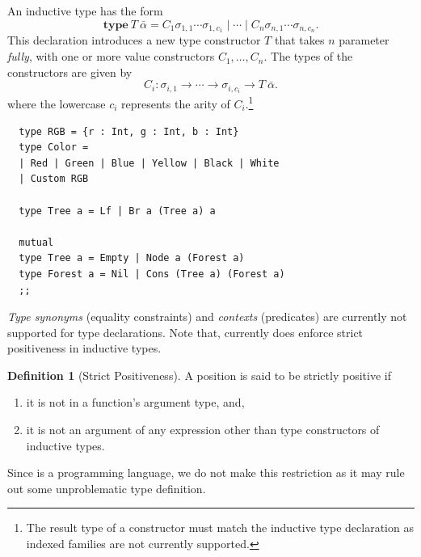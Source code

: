 \documentclass[a4paper, 11pt]{article}
\theoremstyle{remark}\newtheorem*{remark}{Remark}
\theoremstyle{definition}\newtheorem*{definition}{Definition}
\begin{document}
An inductive type has the form
\[
  \mathbf{type}\ T\ \bar{\alpha} =
  C_1 \sigma_{1,1}\cdots\sigma_{1,c_1}
  \mid\cdots
  \mid C_n \sigma_{n,1}\cdots\sigma_{n,c_n}.
\]
This declaration introduces a new type constructor \(T\)
that takes \(n\) parameter \emph{fully}, with one or more value constructors \(C_1,\dots,C_n\).
The types of the constructors are given by
\[
  C_i : \sigma_{i,1}\to\cdots\to\sigma_{i,c_i}\to T\ \bar{\alpha}.
\]
where the lowercase \(c_i\) represents the arity of \(C_i\).\footnote{
  The result type of a constructor must match the inductive type declaration as indexed families
  are not currently supported.
}
\begin{verbatim}
  type RGB = {r : Int, g : Int, b : Int}
  type Color =
  | Red | Green | Blue | Yellow | Black | White
  | Custom RGB

  type Tree a = Lf | Br a (Tree a) a

  mutual
  type Tree a = Empty | Node a (Forest a)
  type Forest a = Nil | Cons (Tree a) (Forest a)
  ;;
\end{verbatim}
\emph{Type synonyms} (equality constraints) and \emph{contexts} (predicates)
are currently not supported for type declarations.
Note that, \Tigris currently does enforce strict positiveness in inductive types.
\begin{definition}[Strict Positiveness]
  A position is said to be strictly positive if
  \begin{enumerate}
    \item it is not in a function's argument type, and,
    \item it is not an argument of any expression other than type constructors of inductive types.
  \end{enumerate}
\end{definition}
Since \Tigris is a programming language, we do not make this restriction as
it may rule out some unproblematic type definition.
\end{document}
